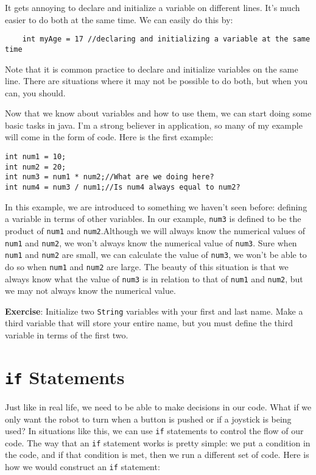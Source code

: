 \documentclass[11pt,fleqn]{article}
\begin{document}
It gets annoying to declare and initialize a variable on different lines. It's
much easier to do both at the same time. We can easily do this by:

\begin{verbatim}
    int myAge = 17 //declaring and initializing a variable at the same time
\end{verbatim}

Note that it is common practice to declare and initialize variables on the same
line. There are situations where it may not be possible to do both, but when you
can, you should.

Now that we know about variables and how to use them, we can start doing some
basic tasks in java. I'm a strong believer in application, so many of my example
will come in the form of code. Here is the first example:

\begin{verbatim}
int num1 = 10;
int num2 = 20;
int num3 = num1 * num2;//What are we doing here?
int num4 = num3 / num1;//Is num4 always equal to num2?
\end{verbatim}

In this example, we are introduced to something we haven't seen before: defining
a variable in terms of other variables. In our example, \texttt{num3} is defined
to be the product of \texttt{num1} and \texttt{num2}.Although we will always
know the numerical values of \texttt{num1} and \texttt{num2}, we won't always
know the numerical value of \texttt{num3}. Sure when \texttt{num1} and
\texttt{num2} are small, we can calculate the value of \texttt{num3}, we won't
be able to do so when \texttt{num1} and \texttt{num2} are large. The beauty of
this situation is that we always know what the value of \texttt{num3} is in
relation to that of \texttt{num1} and \texttt{num2}, but we may not always know
the numerical value. 

\textbf{Exercise}: Initialize two \texttt{String} variables with your first and
last name. Make a third variable that will store your entire name, but you must
define the third variable in terms of the first two. 

\section*{\texttt{if} Statements}

Just like in real life, we need to be able to make decisions in our code. What
if we only want the robot to turn when a button is pushed or if a joystick is
being used? In situations like this, we can use \texttt{if} statements to
control the flow of our code. The way that an \texttt{if} statement works is
pretty simple: we put a condition in the code, and if that condition is met,
then we run a different set of code. Here is how we would construct an
\texttt{if} statement:
\end{document}
